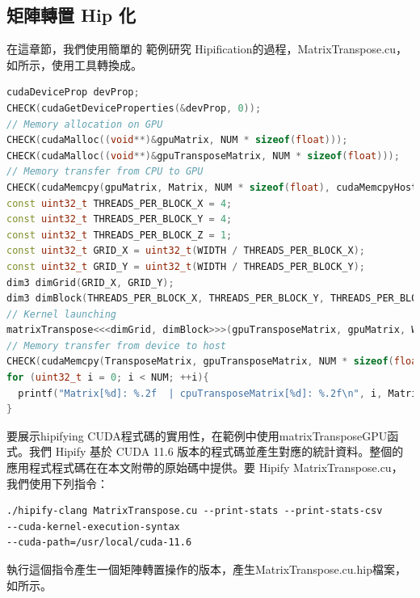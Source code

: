 \subsection{矩陣轉置 Hip 化}

在這章節，我們使用簡單的  範例研究 Hipification的過程，MatrixTranspose.cu，如所示，使用工具轉換成。

\begin{lstlisting}[language=C++, caption={CUDA 矩陣轉置範例片段}, label={lst:CUDA matrix-transpose example snippet}]
cudaDeviceProp devProp;
CHECK(cudaGetDeviceProperties(&devProp, 0));
// Memory allocation on GPU
CHECK(cudaMalloc((void**)&gpuMatrix, NUM * sizeof(float)));
CHECK(cudaMalloc((void**)&gpuTransposeMatrix, NUM * sizeof(float)));
// Memory transfer from CPU to GPU
CHECK(cudaMemcpy(gpuMatrix, Matrix, NUM * sizeof(float), cudaMemcpyHostToDevice));
const uint32_t THREADS_PER_BLOCK_X = 4;
const uint32_t THREADS_PER_BLOCK_Y = 4;
const uint32_t THREADS_PER_BLOCK_Z = 1;
const uint32_t GRID_X = uint32_t(WIDTH / THREADS_PER_BLOCK_X);
const uint32_t GRID_Y = uint32_t(WIDTH / THREADS_PER_BLOCK_Y);
dim3 dimGrid(GRID_X, GRID_Y);
dim3 dimBlock(THREADS_PER_BLOCK_X, THREADS_PER_BLOCK_Y, THREADS_PER_BLOCK_Z);
// Kernel launching
matrixTranspose<<<dimGrid, dimBlock>>>(gpuTransposeMatrix, gpuMatrix, WIDTH);
// Memory transfer from device to host
CHECK(cudaMemcpy(TransposeMatrix, gpuTransposeMatrix, NUM * sizeof(float), cudaMemcpyDeviceToHost));
for (uint32_t i = 0; i < NUM; ++i){
  printf("Matrix[%d]: %.2f  | cpuTransposeMatrix[%d]: %.2f\n", i, Matrix[i], i, cpuTransposeMatrix[i]);
}
\end{lstlisting}

要展示hipifying CUDA程式碼的實用性，在範例中使用matrixTransposeGPU函式。我們 Hipify 基於 CUDA 11.6 版本的程式碼並產生對應的統計資料。整個的應用程式程式碼在在本文附帶的原始碼中提供。要 Hipify MatrixTranspose.cu，我們使用下列指令：

\begin{lstlisting}
./hipify-clang MatrixTranspose.cu --print-stats --print-stats-csv
--cuda-kernel-execution-syntax
--cuda-path=/usr/local/cuda-11.6
\end{lstlisting}

執行這個指令產生一個矩陣轉置操作的版本，產生MatrixTranspose.cu.hip檔案，如所示。

